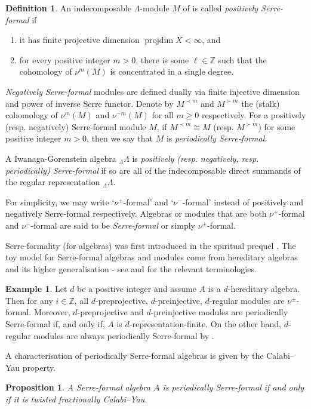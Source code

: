 \documentclass[a4paper,reqno,11pt]{amsart}
\newtheorem{proposition}[theorem]{Proposition}
\theoremstyle{definition}
\newtheorem{definition}[theorem]{Definition}
\newtheorem{example}[theorem]{Example}
\newcommand{\Z}{\mathbb{Z}}
\newcommand{\projdim}{\operatorname{projdim}\nolimits}
\numberwithin{equation}{section}
\begin{document}
\begin{definition}\label{def:nuformal}
An indecomposable $\Lambda$-module $M$ of is called \emph{positively Serre-formal} if
\begin{enumerate}
\item it has finite projective dimension $\projdim X<\infty$, and
\item for every positive integer $m>0$, there is some $\ell\in \Z$ such that the cohomology of $\nu^m(M)$ is concentrated in a single degree.
\end{enumerate}
\emph{Negatively Serre-formal} modules are defined dually via finite injective dimension and power of inverse Serre functor.  
Denote by $M^{\prec m}$ and $M^{\succ m}$ the (stalk) cohomology of $\nu^m(M)$ and $\nu^{-m}(M)$ for all $m\geq 0$ respectively.  For a positively (resp. negatively) Serre-formal module $M$, if $M^{\prec m}\cong M$ (resp. $M^{\succ m}$) for some positive integer $m>0$, then we say that $M$ is \emph{periodically Serre-formal}.

A Iwanaga-Gorenstein algebra ${}_\Lambda\Lambda$ is \emph{positively (resp. negatively, resp. periodically) Serre-formal} if so are all of the indecomposable direct summands of the regular representation ${}_\Lambda\Lambda$.
\end{definition}

For simplicity, we may write `$\nu^+$-formal' and `$\nu^-$-formal' instead of positively and negatively Serre-formal respectively.  Algebras or modules that are both $\nu^+$-formal and $\nu^-$-formal are said to be \emph{Serre-formal} or simply $\nu^\pm$-formal.

Serre-formality (for algebras) was first introduced in the spiritual prequel \cite{CIM}.  The toy model for Serre-formal algebras and modules come from hereditary algebras and its higher generalisation - see \cite{CIM} and \cite{HIO} for the relevant terminologies.
\begin{example}
Let $d$ be a positive integer and assume $A$ is a $d$-hereditary algebra.
Then for any $i\in \Z$, all $d$-preprojective, $d$-preinjective, $d$-regular modules are $\nu^\pm$-formal.  Moreover, $d$-preprojective and $d$-preinjective modules are periodically Serre-formal if, and only if, $A$ is $d$-representation-finite.  On the other hand, $d$-regular modules are always periodically Serre-formal by \cite[Cor 6.23]{HIO}.
\end{example}

A characterisation of periodically Serre-formal algebras is given by the Calabi--Yau property.
\begin{proposition}{\rm \cite[Prop 5.9]{CIM}}\label{nuformal-fCY}
A Serre-formal algebra $A$ is periodically Serre-formal if and only if it is twisted fractionally Calabi--Yau.
\end{proposition}
\end{document}
